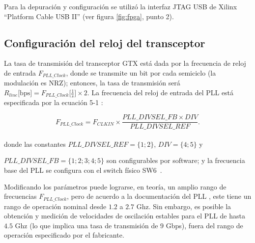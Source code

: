 Para la depuración y configuración se utilizó la interfaz JTAG USB de Xilinx ``Platform Cable
USB II'' \cite{XilJtag} (ver figura \ref{fig:fpga}, punto 2).


\subsection{Configuración del reloj del transceptor}

La tasa de transmisión del transceptor GTX está dada por la
frecuencia de reloj de entrada $F_{PLL\_Clock}$, donde se transmite un
bit por cada semiciclo (la modulación es NRZ); entonces, la tasa de
transmisión será
$R_{line}\mbox{[bps]}=F_{PLL\_Clock}\mbox{[$\frac{1}{s}$]} \times 2$.  La
frecuencia del reloj de entrada del PLL está especificada por la ecuación
5-1 \cite{ug198}:

\begin{equation}
F_{PLL\_Clock} = F_{CLKIN} \times \frac{PLL\_DIVSEL\_FB \times
DIV}{PLL\_DIVSEL\_REF}.%
\end{equation}\\

donde las constantes $PLL\_DIVSEL\_REF = \{1;2\}$, $DIV = \{4;5\} $ y

$PLL\_DIVSEL\_FB = \{1;2;3;4;5\}$ son configurables por software;
y la frecuencia base del PLL se configura con el switch físico
SW6~\cite[Tabla 1-32]{ug347}.


 Modificando los parámetros puede lograrse, en teoría, un amplio rango
de frecuencias $F_{PLL\_Clock}$, pero de acuerdo a la documentación
del PLL \cite[Pág. 71]{ug366}, este tiene un rango de operación nominal desde $1.2$ a
$2.7$ Ghz. Sin embargo, es posible \cite{OBGAH2010} la
obtención y medición de velocidades de oscilación estables para el PLL
de hasta $4.5$ Ghz (lo que implica una tasa de transmisión de $9$ Gbps),
fuera del rango de operación especificado por el fabricante.

